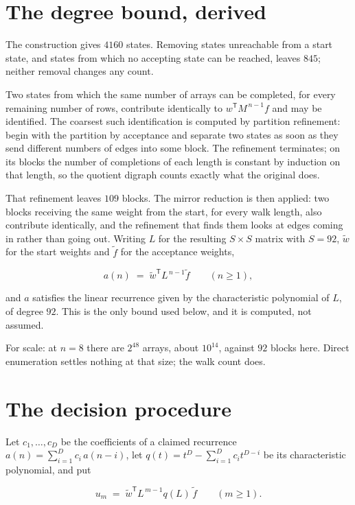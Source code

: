 \documentclass[11pt]{article}
\theoremstyle{definition}
\begin{document}
\section{The degree bound, derived}

The construction gives $4160$ states. Removing states unreachable from a start state, and states from which no accepting state can be reached, leaves $845$; neither removal changes any count.

Two states from which the same number of arrays can be completed, for every remaining number of rows, contribute identically to $w^{\mathsf T}M^{\,n-1}f$ and may be identified. The coarsest such identification is computed by partition refinement: begin with the partition by acceptance and separate two states as soon as they send different numbers of edges into some block. The refinement terminates; on its blocks the number of completions of each length is constant by induction on that length, so the quotient digraph counts exactly what the original does.

That refinement leaves $109$ blocks. The mirror reduction is then applied: two blocks receiving the same weight from the start, for every walk length, also contribute identically, and the refinement that finds them looks at edges coming in rather than going out. Writing $L$ for the resulting $S \times S$ matrix with $S = 92$, $\tilde w$ for the start weights and $\tilde f$ for the acceptance weights,

\[a(n) \;=\; \tilde w^{\mathsf T} L^{\,n-1} \tilde f \qquad (n \ge 1),\]

and $a$ satisfies the linear recurrence given by the characteristic polynomial of $L$, of degree $92$. This is the only bound used below, and it is computed, not assumed.

For scale: at $n = 8$ there are $2^{48}$ arrays, about $10^{14}$, against $92$ blocks here. Direct enumeration settles nothing at that size; the walk count does.

\section{The decision procedure}

Let $c_1,\dots,c_D$ be the coefficients of a claimed recurrence $a(n) = \sum_{i=1}^{D} c_i\,a(n-i)$, let $q(t) = t^{D} - \sum_{i=1}^{D} c_i t^{D-i}$ be its characteristic polynomial, and put

\[u_m \;=\; \tilde w^{\mathsf T} L^{\,m-1} q(L)\,\tilde f \qquad (m \ge 1).\]
\end{document}
